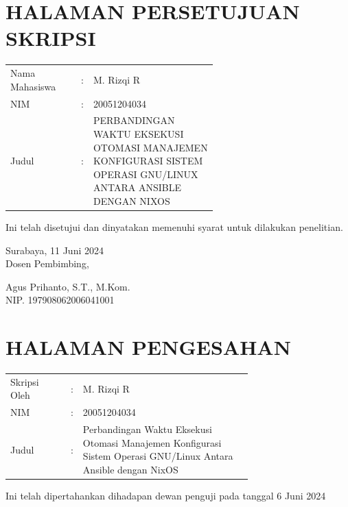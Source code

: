 \documentclass[10pt,]{report}
\begin{document}
\chapter*{HALAMAN PERSETUJUAN SKRIPSI}
\begin{adjustwidth}{0.0cm}{}
	\begin{tabular}{@{}lcp{0.6\linewidth}}
		Nama Mahasiswa & : & M. Rizqi R                                    \\
		NIM            & : & 20051204034                                   \\
		Judul          & : & PERBANDINGAN WAKTU EKSEKUSI OTOMASI MANAJEMEN
		KONFIGURASI SISTEM OPERASI GNU/LINUX ANTARA ANSIBLE DENGAN NIXOS   \\
	\end{tabular}

	\vspace{1cm}
	\noindent
	Ini telah disetujui dan dinyatakan memenuhi syarat untuk dilakukan penelitian.\\

	\vspace{5cm}

	\noindent
	Surabaya, 11 Juni 2024\\
	Dosen Pembimbing,\\
	\vspace{2cm}

	\noindent
	Agus Prihanto, S.T., M.Kom. \\
	NIP. 197908062006041001\\

\end{adjustwidth}
\newpage
\chapter*{HALAMAN PENGESAHAN}
\begin{adjustwidth}{0pt}{}
	\begin{tabular}{@{}lcp{0.7\linewidth}}
		Skripsi Oleh & : & M. Rizqi R                                                 \\
		NIM          & : & 20051204034                                                \\
		Judul        & : & \raggedright Perbandingan Waktu Eksekusi Otomasi Manajemen
		Konfigurasi Sistem Operasi GNU/Linux Antara Ansible dengan NixOS              \\
	\end{tabular}

	\noindent Ini telah dipertahankan dihadapan dewan penguji pada tanggal 6 Juni 2024 \\
\end{adjustwidth}
\end{document}
